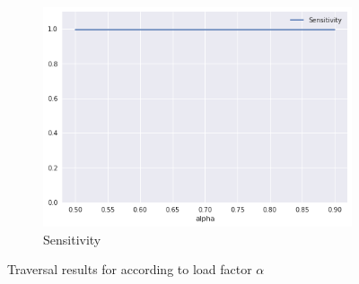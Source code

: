 \begin{figure}[htbp]
    \begin{subfigure}{.5\textwidth}
        \centering
        \includegraphics[width=\textwidth]{figures/e_coli-dbht-sensitivity}
        \caption{Sensitivity}\label{fig:ecoli-art-dbht-traversal-sensitivity}
    \end{subfigure}
    \caption{Traversal results for \dBHT according to load factor $\alpha$}\label{fig:ecoli-art-dbcm-threshold}
\end{figure}